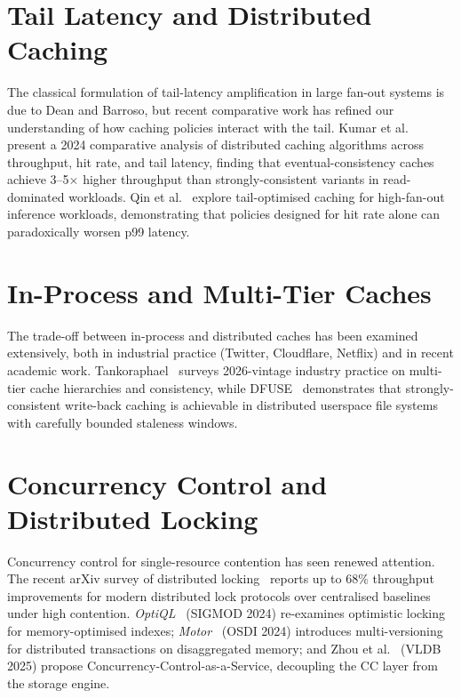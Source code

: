 \section{Tail Latency and Distributed Caching}
The classical formulation of tail-latency amplification in large fan-out systems is due to Dean and Barroso, but recent comparative work has refined our understanding of how caching policies interact with the tail. Kumar et al.~\cite{kumar2024caching} present a 2024 comparative analysis of distributed caching algorithms across throughput, hit rate, and tail latency, finding that eventual-consistency caches achieve 3--5$\times$ higher throughput than strongly-consistent variants in read-dominated workloads. Qin et al.~\cite{qin2024tailcache} explore tail-optimised caching for high-fan-out inference workloads, demonstrating that policies designed for hit rate alone can paradoxically worsen p99 latency.

\section{In-Process and Multi-Tier Caches}
The trade-off between in-process and distributed caches has been examined extensively, both in industrial practice (Twitter, Cloudflare, Netflix) and in recent academic work. Tankoraphael~\cite{tankoraphael2026architecture} surveys 2026-vintage industry practice on multi-tier cache hierarchies and consistency, while DFUSE~\cite{wong2024dfuse} demonstrates that strongly-consistent write-back caching is achievable in distributed userspace file systems with carefully bounded staleness windows.

\section{Concurrency Control and Distributed Locking}
Concurrency control for single-resource contention has seen renewed attention. The recent arXiv survey of distributed locking~\cite{anonymous2025distlock} reports up to 68\% throughput improvements for modern distributed lock protocols over centralised baselines under high contention. \emph{OptiQL}~\cite{wang2024optiql} (SIGMOD 2024) re-examines optimistic locking for memory-optimised indexes; \emph{Motor}~\cite{wei2024motor} (OSDI 2024) introduces multi-versioning for distributed transactions on disaggregated memory; and Zhou et al.~\cite{zhou2025ccaas} (VLDB 2025) propose Concurrency-Control-as-a-Service, decoupling the CC layer from the storage engine.

